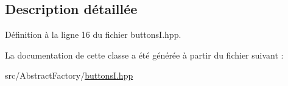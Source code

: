 \subsection{Description détaillée}


Définition à la ligne 16 du fichier buttons\+I.\+hpp.



La documentation de cette classe a été générée à partir du fichier suivant \+:\begin{DoxyCompactItemize}
\item 
src/\+Abstract\+Factory/\hyperlink{buttonsI_8hpp}{buttons\+I.\+hpp}\end{DoxyCompactItemize}
